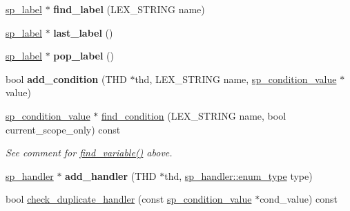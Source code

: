 \begin{DoxyCompactItemize}
\item 
\mbox{\label{classsp__pcontext_ac2353f5c480f283fc626f0aad8543237}} 
\mbox{\hyperlink{classsp__label}{sp\+\_\+label}} $\ast$ {\bfseries find\+\_\+label} (L\+E\+X\+\_\+\+S\+T\+R\+I\+NG name)
\item 
\mbox{\label{classsp__pcontext_a31c0db7687db96154add9e2e79718e27}} 
\mbox{\hyperlink{classsp__label}{sp\+\_\+label}} $\ast$ {\bfseries last\+\_\+label} ()
\item 
\mbox{\label{classsp__pcontext_a9744a4b041c7fa2d8413b84ab5bac712}} 
\mbox{\hyperlink{classsp__label}{sp\+\_\+label}} $\ast$ {\bfseries pop\+\_\+label} ()
\item 
\mbox{\label{classsp__pcontext_a81bf4ae0fe08bdcd267d00b55249d4fa}} 
bool {\bfseries add\+\_\+condition} (T\+HD $\ast$thd, L\+E\+X\+\_\+\+S\+T\+R\+I\+NG name, \mbox{\hyperlink{classsp__condition__value}{sp\+\_\+condition\+\_\+value}} $\ast$value)
\item 
\mbox{\label{classsp__pcontext_a3330cf065ed6d671b5a149335c0b300e}} 
\mbox{\hyperlink{classsp__condition__value}{sp\+\_\+condition\+\_\+value}} $\ast$ \mbox{\hyperlink{classsp__pcontext_a3330cf065ed6d671b5a149335c0b300e}{find\+\_\+condition}} (L\+E\+X\+\_\+\+S\+T\+R\+I\+NG name, bool current\+\_\+scope\+\_\+only) const
\begin{DoxyCompactList}\small\item\em See comment for \mbox{\hyperlink{classsp__pcontext_aa87f03211c0a7efcbf5df3a40471a599}{find\+\_\+variable()}} above. \end{DoxyCompactList}\item 
\mbox{\label{classsp__pcontext_a8f68eddde53c9ac83544d6daab8b4f7a}} 
\mbox{\hyperlink{classsp__handler}{sp\+\_\+handler}} $\ast$ {\bfseries add\+\_\+handler} (T\+HD $\ast$thd, \mbox{\hyperlink{classsp__handler_a702400dd1cd8b2933a38a9e4a5f1eb09}{sp\+\_\+handler\+::enum\+\_\+type}} type)
\item 
bool \mbox{\hyperlink{classsp__pcontext_a6e27c46b3cb4dc5f5140c8dcb7564780}{check\+\_\+duplicate\+\_\+handler}} (const \mbox{\hyperlink{classsp__condition__value}{sp\+\_\+condition\+\_\+value}} $\ast$cond\+\_\+value) const
\item 

\end{DoxyCompactItemize}
